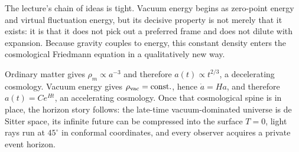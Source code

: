 The lecture's chain of ideas is tight. Vacuum energy begins as zero-point energy and virtual fluctuation energy, but its decisive property is not merely that it exists: it is that it does not pick out a preferred frame and does not dilute with expansion. Because gravity couples to energy, this constant density enters the cosmological Friedmann equation in a qualitatively new way.

Ordinary matter gives \(\rho_m\propto a^{-3}\) and therefore \(a(t)\propto t^{2/3}\), a decelerating cosmology. Vacuum energy gives \(\rho_{\rm vac}=\text{const.}\), hence \(\dot a=Ha\), and therefore \(a(t)=Ce^{Ht}\), an accelerating cosmology. Once that cosmological spine is in place, the horizon story follows: the late-time vacuum-dominated universe is de Sitter space, its infinite future can be compressed into the surface \(T=0\), light rays run at \(45^\circ\) in conformal coordinates, and every observer acquires a private event horizon.